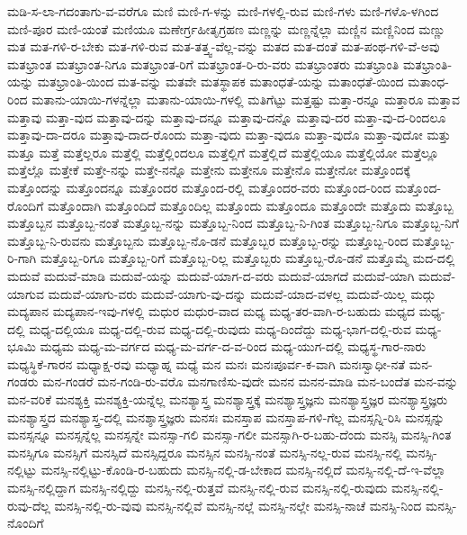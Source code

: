 {ಮಡಿ-ಸ-ಲಾ-ಗದಂತಾಗು-ವ-ವರೆಗೂ
ಮಣಿ
ಮಣಿ-ಗ-ಳನ್ನು
ಮಣಿ-ಗಳಲ್ಲಿ-ರುವ
ಮಣಿ-ಗಳು
ಮಣಿ-ಗಳೊ-ಳಗಿಂದ
ಮಣಿ-ಪೂರ
ಮಣಿ-ಯಂತೆ
ಮಣಿಯೂ
ಮಣೇರ್ಗ್ರಹೀತೃಗ್ರಹಣ
ಮಣ್ಣನ್ನು
ಮಣ್ಣನ್ನೆಲ್ಲಾ
ಮಣ್ಣಿನ
ಮಣ್ಣಿನಿಂದ
ಮಣ್ಣು
ಮತ
ಮತ-ಗಳಿ-ರ-ಬೇಕು
ಮತ-ಗಳಿ-ರುವ
ಮತ-ತತ್ತ್ವ-ವೆಲ್ಲ-ವನ್ನು
ಮತದ
ಮತ-ದಂತೆ
ಮತ-ಪಂಥ-ಗಳಿ-ವೆ-ಅವು
ಮತಭ್ರಾಂತ
ಮತಭ್ರಾಂತ-ನಿಗೂ
ಮತಭ್ರಾಂತ-ರಿಗೆ
ಮತಭ್ರಾಂತ-ರಿ-ರು-ವರು
ಮತಭ್ರಾಂತರು
ಮತಭ್ರಾಂತಿ
ಮತಭ್ರಾಂತಿ-ಯನ್ನು
ಮತಭ್ರಾಂತಿ-ಯಿಂದ
ಮತ-ವನ್ನು
ಮತವೇ
ಮತಸ್ಥಾಪಕ
ಮತಾಂಧತೆ-ಯನ್ನು
ಮತಾಂಧತೆ-ಯಿಂದ
ಮತಾಂಧ-ರಿಂದ
ಮತಾನು-ಯಾಯಿ-ಗಳನ್ನೆಲ್ಲಾ
ಮತಾನು-ಯಾಯಿ-ಗಳಲ್ಲಿ
ಮತಿಗೆಟ್ಟು
ಮತ್ತಷ್ಟು
ಮತ್ತಾ-ರನ್ನೂ
ಮತ್ತಾರೂ
ಮತ್ತಾವ
ಮತ್ತಾವು
ಮತ್ತಾ-ವುದ
ಮತ್ತಾವು-ದನ್ನು
ಮತ್ತಾವು-ದನ್ನೂ
ಮತ್ತಾವು-ದನ್ನೊ
ಮತ್ತಾವು-ದರ
ಮತ್ತಾ-ವು-ದ-ರಿಂದಲೂ
ಮತ್ತಾವು-ದಾ-ದರೂ
ಮತ್ತಾವು-ದಾದ-ರೊಂದು
ಮತ್ತಾ-ವುದು
ಮತ್ತಾ-ವುದೂ
ಮತ್ತಾ-ವುದೊ
ಮತ್ತಾ-ವುದೋ
ಮತ್ತು
ಮತ್ತೂ
ಮತ್ತೆ
ಮತ್ತೆಲ್ಲರೂ
ಮತ್ತೆಲ್ಲಿ
ಮತ್ತೆಲ್ಲಿಂದಲೂ
ಮತ್ತೆಲ್ಲಿಗೆ
ಮತ್ತೆಲ್ಲಿದೆ
ಮತ್ತೆಲ್ಲಿಯೂ
ಮತ್ತೆಲ್ಲಿಯೋ
ಮತ್ತೆಲ್ಲೂ
ಮತ್ತೆಲ್ಲೊ
ಮತ್ತೇಕೆ
ಮತ್ತೇ-ನನ್ನು
ಮತ್ತೇ-ನನ್ನೊ
ಮತ್ತೇನು
ಮತ್ತೇನೂ
ಮತ್ತೇನೊ
ಮತ್ತೇನೋ
ಮತ್ತೊಂದಕ್ಕೆ
ಮತ್ತೊಂದನ್ನು
ಮತ್ತೊಂದನ್ನೂ
ಮತ್ತೊಂದರ
ಮತ್ತೊಂದ-ರಲ್ಲಿ
ಮತ್ತೊಂದರ-ವರು
ಮತ್ತೊಂದ-ರಿಂದ
ಮತ್ತೊಂದ-ರೊಂದಿಗೆ
ಮತ್ತೊಂದಾಗಿ
ಮತ್ತೊಂದಿದೆ
ಮತ್ತೊಂದಿಲ್ಲ
ಮತ್ತೊಂದು
ಮತ್ತೊಂದೂ
ಮತ್ತೊಂದೇ
ಮತ್ತೊದು
ಮತ್ತೊಬ್ಬ
ಮತ್ತೊಬ್ಬನ
ಮತ್ತೊಬ್ಬ-ನಂತೆ
ಮತ್ತೊಬ್ಬ-ನನ್ನು
ಮತ್ತೊಬ್ಬ-ನಿಂದ
ಮತ್ತೊಬ್ಬ-ನಿ-ಗಿಂತ
ಮತ್ತೊಬ್ಬ-ನಿಗೂ
ಮತ್ತೊಬ್ಬ-ನಿಗೆ
ಮತ್ತೊಬ್ಬ-ನಿ-ರುವನು
ಮತ್ತೊಬ್ಬನು
ಮತ್ತೊಬ್ಬ-ನೊ-ಡನೆ
ಮತ್ತೊಬ್ಬರ
ಮತ್ತೊಬ್ಬ-ರನ್ನು
ಮತ್ತೊಬ್ಬ-ರಿಂದ
ಮತ್ತೊಬ್ಬ-ರಿ-ಗಾಗಿ
ಮತ್ತೊಬ್ಬ-ರಿಗೂ
ಮತ್ತೊಬ್ಬ-ರಿಗೆ
ಮತ್ತೊಬ್ಬ-ರಿಲ್ಲ
ಮತ್ತೊಬ್ಬರು
ಮತ್ತೊಬ್ಬ-ರೊ-ಡನೆ
ಮತ್ತೊಮ್ಮೆ
ಮದ-ದಲ್ಲಿ
ಮದುವೆ
ಮದುವೆ-ಮಾಡಿ
ಮದುವೆ-ಯನ್ನು
ಮದುವೆ-ಯಾಗ-ದ-ವರು
ಮದುವೆ-ಯಾಗದೆ
ಮದುವೆ-ಯಾಗಿ
ಮದುವೆ-ಯಾಗುವ
ಮದುವೆ-ಯಾಗು-ವರು
ಮದುವೆ-ಯಾಗು-ವು-ದನ್ನು
ಮದುವೆ-ಯಾದ-ವಳಲ್ಲ
ಮದುವೆ-ಯಿಲ್ಲ
ಮದ್ಗು
ಮದ್ಯಪಾನ
ಮದ್ಯಪಾನ-ಇವು-ಗಳಲ್ಲಿ
ಮಧುರ
ಮಧುರ-ವಾದ
ಮಧ್ಯ
ಮಧ್ಯ-ತರ-ವಾಗಿ-ರ-ಬಹುದು
ಮಧ್ಯದ
ಮಧ್ಯ-ದಲ್ಲಿ
ಮಧ್ಯ-ದಲ್ಲಿಯೂ
ಮಧ್ಯ-ದಲ್ಲಿ-ರುವ
ಮಧ್ಯ-ದಲ್ಲಿ-ರುವುದು
ಮಧ್ಯ-ದಿಂದೆದ್ದು
ಮಧ್ಯ-ಭಾಗ-ದಲ್ಲಿ-ರುವ
ಮಧ್ಯ-ಭೂಮಿ
ಮಧ್ಯಮ
ಮಧ್ಯ-ಮ-ವರ್ಗದ
ಮಧ್ಯ-ಮ-ವರ್ಗ-ದ-ವ-ರಿಂದ
ಮಧ್ಯ-ಯುಗ-ದಲ್ಲಿ
ಮಧ್ಯಸ್ಥ-ಗಾರ-ನಾರು
ಮಧ್ಯಸ್ಥಿಕೆ-ಗಾರನ
ಮಧ್ಯಾಕ್ಷ-ರವು
ಮಧ್ಯಾಹ್ನ
ಮಧ್ಯೆ
ಮನ
ಮನಃ
ಮನಃಪೂರ್ವ-ಕ-ವಾಗಿ
ಮನಃಸ್ವಾಧೀ-ನತೆ
ಮನ-ಗಂಡರು
ಮನ-ಗಂಡರೆ
ಮನ-ಗಂಡಿ-ರು-ವರೊ
ಮನಗಾಣಿಸು-ವುದೇ
ಮನನ
ಮನನ-ಮಾಡಿ
ಮನ-ಬಂದೆತ
ಮನ-ವನ್ನು
ಮನ-ವರಿಕೆ
ಮನಶ್ಯಕ್ತಿ
ಮನಶ್ಯಕ್ತಿ-ಯನ್ನೆಲ್ಲ
ಮನಶ್ಯಾಸ್ತ್ರ
ಮನಶ್ಯಾಸ್ತ್ರಕ್ಕೆ
ಮನಶ್ಯಾಸ್ತ್ರಜ್ಞನು
ಮನಶ್ಯಾಸ್ತ್ರಜ್ಞರ
ಮನಶ್ಯಾಸ್ತ್ರಜ್ಞರು
ಮನಶ್ಯಾಸ್ತ್ರದ
ಮನಶ್ಯಾಸ್ತ್ರ-ದಲ್ಲಿ
ಮನಶ್ಶಾಸ್ತ್ರಜ್ಞರು
ಮನಸಃ
ಮನಸ್ತಾಪ
ಮನಸ್ತಾಪ-ಗಳಿ-ಗೆಲ್ಲ
ಮನಸ್ಸನ್ನಿ-ರಿಸಿ
ಮನಸ್ಸನ್ನು
ಮನಸ್ಸನ್ನೂ
ಮನಸ್ಸನ್ನೆಲ್ಲ
ಮನಸ್ಸನ್ನೇ
ಮನಸ್ಸಾ-ಗಲಿ
ಮನಸ್ಸಾ-ಗಲೀ
ಮನಸ್ಸಾಗಿ-ರ-ಬಹು-ದೆಂದು
ಮನಸ್ಸಿ
ಮನಸ್ಸಿ-ಗಿಂತ
ಮನಸ್ಸಿಗೂ
ಮನಸ್ಸಿಗೆ
ಮನಸ್ಸಿದೆ
ಮನಸ್ಸಿದ್ದರೂ
ಮನಸ್ಸಿನ
ಮನಸ್ಸಿ-ನಂತೆ
ಮನಸ್ಸಿ-ನಲ್ಲ-ರುವ
ಮನಸ್ಸಿ-ನಲ್ಲಿ
ಮನಸ್ಸಿ-ನಲ್ಲಿಟ್ಟು
ಮನಸ್ಸಿ-ನಲ್ಲಿಟ್ಟು-ಕೊಂಡಿ-ರ-ಬಹುದು
ಮನಸ್ಸಿ-ನಲ್ಲಿ-ಡ-ಬೇಕಾದ
ಮನಸ್ಸಿ-ನಲ್ಲಿದೆ
ಮನಸ್ಸಿ-ನಲ್ಲಿ-ದೆ-ಇ-ವೆಲ್ಲಾ
ಮನಸ್ಸಿ-ನಲ್ಲಿದ್ದಾಗ
ಮನಸ್ಸಿ-ನಲ್ಲಿದ್ದು
ಮನಸ್ಸಿ-ನಲ್ಲಿ-ರುತ್ತವೆ
ಮನಸ್ಸಿ-ನಲ್ಲಿ-ರುವ
ಮನಸ್ಸಿ-ನಲ್ಲಿ-ರುವುದು
ಮನಸ್ಸಿ-ನಲ್ಲಿ-ರುವು-ದೆಲ್ಲ
ಮನಸ್ಸಿ-ನಲ್ಲಿ-ರು-ವುವು
ಮನಸ್ಸಿ-ನಲ್ಲಿವೆ
ಮನಸ್ಸಿ-ನಲ್ಲೆ
ಮನಸ್ಸಿ-ನಲ್ಲೇ
ಮನಸ್ಸಿ-ನಾಚೆ
ಮನಸ್ಸಿ-ನಿಂದ
ಮನಸ್ಸಿ-ನೊಂದಿಗೆ
}
